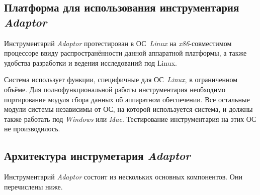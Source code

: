 \subsection{Платформа для использования инструментария \textit{Adaptor}}
Инструментарий \textit{Adaptor} протестирован в ОС~\textit{Linux} на \textit{x86}-совместимом процессоре ввиду распространённости данной аппаратной платформы, а также удобства разработки и ведения исследований под Linux.

Система использует функции, специфичные для ОС~\textit{Linux}, в ограниченном объёме. Для полнофункциональной работы инструментария необходимо портирование модуля сбора данных об аппаратном обеспечении. Все остальные модули системы независимы от ОС, на которой используется система, и должны также работать под \textit{Windows} или \textit{Mac}. Тестирование инструментария на этих ОС не производилось.


\subsection{Архитектура инструметария \textit{Adaptor}}
Инструментарий \textit{Adaptor} состоит из нескольких основных компонентов. Они перечислены ниже.

